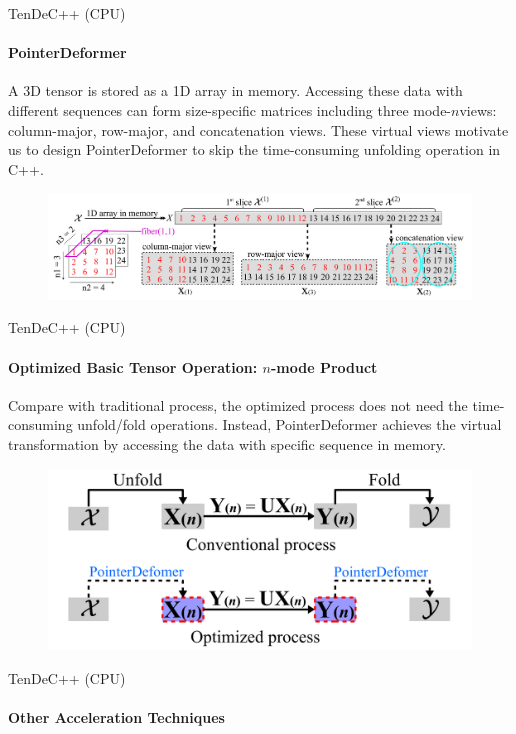\documentclass[t, 10pt, handout, aspectratio=169]{beamer}
\begin{document}
\begin{frame}{TenDeC++ (CPU)}
\framesubtitle{PointerDeformer}
A 3D tensor is stored as a 1D array in memory. Accessing these data with different sequences can form size-specific matrices including three mode-$n$views: column-major, row-major, and concatenation views. These virtual views motivate us to design PointerDeformer to skip the time-consuming unfolding operation in C++.
\begin{figure}
	\centering  
	\includegraphics[width=\linewidth]{figs/pointerdeformer_example.png}
	\label{fig:pointerdeformer_example}
\end{figure}
\end{frame}

\begin{frame}{TenDeC++ (CPU)}
\framesubtitle{Optimized Basic Tensor Operation: $n$-mode Product}
Compare with traditional process, the optimized process does not need the time-consuming unfold/fold operations. Instead, PointerDeformer achieves the virtual transformation by accessing the data with specific sequence in memory.
\begin{figure}
	\centering  
	\includegraphics[width=0.6\linewidth]{figs/tendecpp_optimized.png}
	\label{fig:tendecpp_optimized}
\end{figure}
\end{frame}

\begin{frame}{TenDeC++ (CPU)}
\framesubtitle{Other Acceleration Techniques}
\large
{}
\end{frame}
\end{document}
